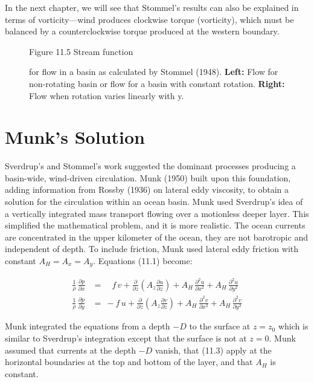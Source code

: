 In the next chapter, we will see that Stommel's results can also be
explained in terms of vorticity---wind produces clockwise torque
(vorticity), which must be balanced by a counterclockwise torque
produced at the western boundary.

\begin{figure}[h!]
\footnotesize
Figure 11.5 Stream function \rule{0pt}{3ex}for flow in a basin as
calculated by Stommel (1948).  \textbf{Left:} Flow for non-rotating
basin or flow for a basin with constant rotation. \textbf{Right:} Flow
when rotation varies linearly with y.
\label{fig:stommelcurrents}
\vspace{-3ex}
\end{figure}

\section{Munk's Solution}
Sverdrup's and Stommel's work suggested the
dominant processes producing a basin-wide, wind-driven
circulation. Munk (1950) built upon this foundation, adding
information from Rossby (1936) on lateral eddy viscosity, to obtain a
solution for the circulation within an ocean basin. Munk used
Sverdrup's idea of a vertically integrated mass transport flowing over
a motionless deeper layer. This simplified the mathematical problem,
and it is more realistic. The ocean currents are concentrated in the
upper kilometer of the ocean, they are not barotropic and independent
of depth. To include friction, Munk used lateral eddy friction with
constant $A_H = A_x = A_y$. Equations (11.1) become:

\begin{subequations}
\begin{align}
\frac{1}{\rho}\, \frac{\partial{p}}{\partial{x}}
&=\quad f \,v+\frac{\partial}{\partial{z}}\left(A_z
\frac{\partial{u}}{\partial{z}}\right) + A_H\,
\frac{\partial^2{u}}{\partial{x}^2} + A_H\, \frac{\partial^2{u}}{\partial{y}^2} \\
\frac{1}{\rho}\, \frac{\partial{p}}{\partial{y}} &=\:-f \,u+\frac{\partial}{\partial{z}}\left(A_z
\frac{\partial{v}}{\partial{z}}\right) + A_H\, \frac{\partial^2{v}}{\partial{x}^2} + A_H\,
\frac{\partial^2{v}}{\partial{y}^2}
\end{align}
\end{subequations}

Munk integrated the equations from a depth $-D$ to the surface at
$z = z_0$ which is similar to Sverdrup's integration except that the
surface is not at $z = 0$.  Munk assumed that currents at the depth
$-D$ vanish, that (11.3) apply at the horizontal boundaries at the top
and bottom of the layer, and that $A_H$ is constant.

